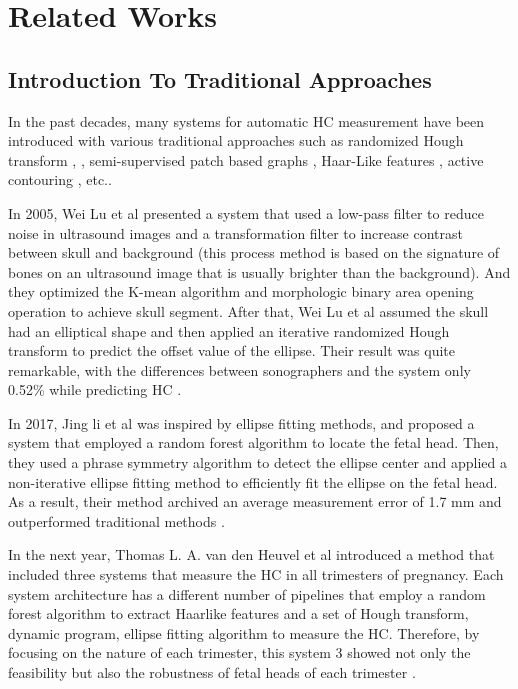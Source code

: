 \chapter{Related Works}
\section{Introduction To Traditional Approaches}
\label{section:traditional_approaches}
\noindent

	In the past decades, many systems for automatic HC measurement have been introduced with various traditional approaches such as randomized Hough transform \cite{lu}, \cite{espinoza}, semi-supervised patch based graphs \cite{ciurte}, Haar-Like features \cite{thomas}, active contouring \cite{perez}, etc..
	
	In 2005, Wei Lu et al presented a system that used a low-pass filter to reduce noise in ultrasound images and a transformation filter to increase contrast between skull and background (this process method is based on the signature of bones on an ultrasound image that is usually brighter than the background). And they optimized the K-mean algorithm and morphologic binary area opening operation to achieve skull segment. After that, Wei Lu et al assumed the skull had an elliptical shape and then applied an iterative randomized Hough transform to predict the offset value of the ellipse. Their result was quite remarkable, with the differences between sonographers and the system only 0.52\% while predicting HC \cite{lu}.
	
	In 2017, Jing li et al was inspired by ellipse fitting methods, and proposed a system that employed a random forest algorithm to locate the fetal head. Then, they used a phrase symmetry algorithm to detect the ellipse center and applied a non-iterative ellipse fitting method to efficiently fit the ellipse on the fetal head. As a result, their method archived an average measurement error of 1.7 mm and outperformed traditional methods \cite{li}.
	
	In the next year, Thomas L. A. van den Heuvel et al introduced a method that included three systems that measure the HC in all trimesters of pregnancy. Each system architecture has a different number of pipelines that employ a random forest algorithm to extract Haarlike features and a set of Hough transform, dynamic program, ellipse fitting algorithm to measure the HC. Therefore, by focusing on the nature of each trimester, this system 3 showed not only the feasibility but also the robustness of fetal heads of each trimester \cite{thomas}.

